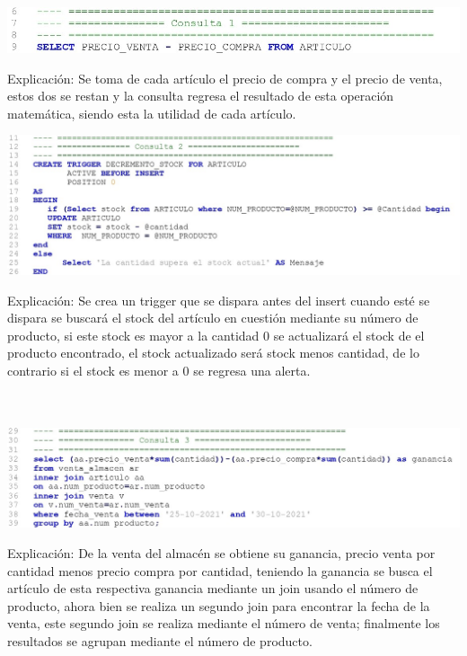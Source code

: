 \documentclass[letter,12pt]{article} %
\begin{document}
\\\\
\begin{center} 
\includegraphics{imagenes/B01.jpg}
\end{center}
Explicación: Se toma de cada artículo el precio de compra y el precio de venta, estos dos se restan y la consulta regresa el resultado de esta operación matemática, siendo esta la utilidad de cada artículo.
\newpage
\begin{center} 
\includegraphics[scale=0.85]{imagenes/B02.jpg}
\end{center}
Explicación: Se crea un trigger que se dispara antes del insert cuando esté se dispara se buscará el stock del artículo en cuestión mediante su número de producto, si este stock es mayor a la cantidad 0 se actualizará el stock de el producto encontrado, el stock actualizado será stock menos cantidad, de lo contrario si el stock es menor a 0 se regresa una alerta.
\\\\\\
\begin{center} 
\includegraphics[scale=0.85]{imagenes/B03.jpg}
\end{center}
Explicación: De la venta del almacén se obtiene su ganancia, precio venta por cantidad menos precio compra por cantidad, teniendo la ganancia se busca el artículo de esta respectiva ganancia mediante un join usando el número de producto, ahora bien se realiza un segundo join para encontrar la fecha de la venta, este segundo join se realiza mediante el número de venta; finalmente los resultados se agrupan mediante el número de producto.
\end{document}
